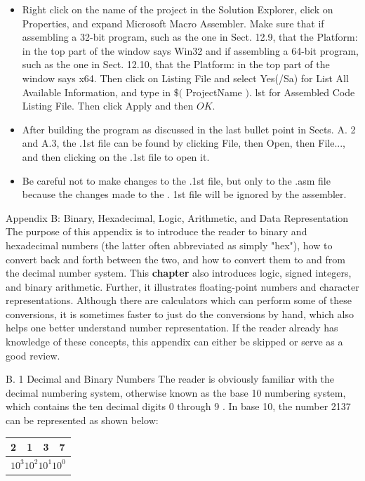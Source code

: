\documentclass[10pt]{book}
\begin{document}
\begin{itemize}
  \item Right click on the name of the project in the Solution Explorer, click on Properties, and expand Microsoft Macro Assembler. Make sure that if assembling a 32-bit program, such as the one in Sect. 12.9, that the Platform: in the top part of the window says Win32 and if assembling a 64-bit program, such as the one in Sect. 12.10, that the Platform: in the top part of the window says x64. Then click on Listing File and select Yes(/Sa) for List All Available Information, and type in $\$($ ProjectName $)$. lst for Assembled Code Listing File. Then click Apply and then $O K$.
  \item After building the program as discussed in the last bullet point in Sects. A. 2 and A.3, the .1st file can be found by clicking File, then Open, then File..., and then clicking on the .1st file to open it.
  \item Be careful not to make changes to the .1st file, but only to the .asm file because the changes made to the . 1st file will be ignored by the assembler.
\end{itemize}

Appendix B: Binary, Hexadecimal, Logic, Arithmetic, and Data Representation
The purpose of this appendix is to introduce the reader to binary and hexadecimal numbers (the latter often abbreviated as simply "hex"), how to convert back and forth between the two, and how to convert them to and from the decimal number system. This \textbf{chapter} also introduces logic, signed integers, and binary arithmetic. Further, it illustrates floating-point numbers and character representations. Although there are calculators which can perform some of these conversions, it is sometimes faster to just do the conversions by hand, which also helps one better understand number representation. If the reader already has knowledge of these concepts, this appendix can either be skipped or serve as a good review.

B. 1 Decimal and Binary Numbers
The reader is obviously familiar with the decimal numbering system, otherwise known as the base 10 numbering system, which contains the ten decimal digits 0 through 9 . In base 10, the number 2137 can be represented as shown below:

\begin{center}
\begin{tabular}{|l|l|l|l|}
\hline
2 & 1 & 3 & 7 \\
\hline
\multicolumn{4}{|c|}{$10^{3} 10^{2} 10^{1} 10^{0}$} \\
\hline
\end{tabular}
\end{center}
\end{document}

